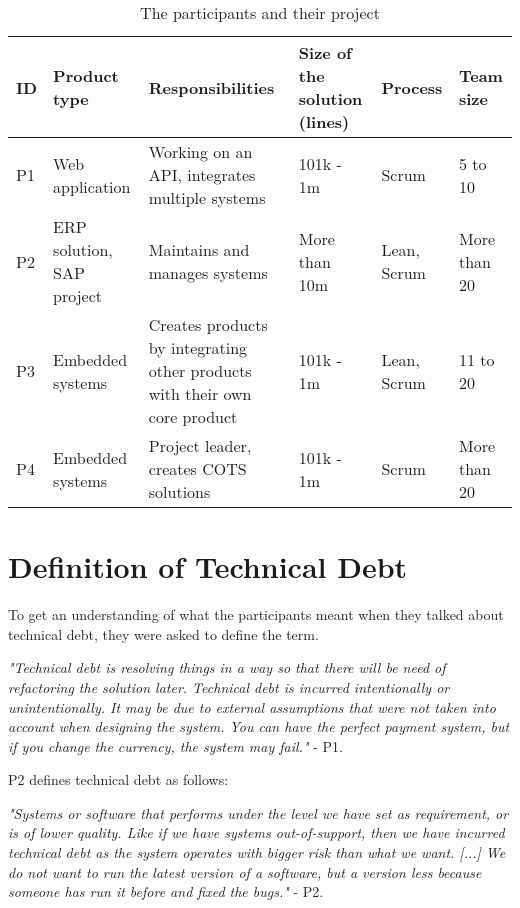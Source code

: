 \begin{table}[ht!]
	\centering
    \begin{tabular}{|p{0.5cm}|p{2.5cm}|p{3.5cm}|p{2cm}|p{2cm}|p{2cm}|}
    \hline
    \textbf{ID} & \textbf{Product type} & \textbf{Responsibilities} & \textbf{Size of the solution (lines)} & \textbf{Process} & \textbf{Team size}\\ \hline
    P1 & Web application & Working on an API, integrates multiple systems & 101k - 1m & Scrum & 5 to 10 \\ \hline
    P2 & ERP solution, SAP project & Maintains and manages systems & More than 10m & Lean, Scrum & More than 20 \\ \hline
    P3 & Embedded systems & Creates products by integrating other products with their own core product & 101k - 1m & Lean, Scrum & 11 to 20\\ \hline
    P4 & Embedded systems & Project leader, creates COTS solutions & 101k - 1m & Scrum & More than 20 \\ \hline
    \end{tabular}
    \caption{The participants and their project} \label{tab:participantsResponsbilities}
\end{table}







\section{Definition of Technical Debt}
\label{sec:techDebt}
To get an understanding of what the participants meant when they talked about technical debt, they were asked to define the term.
\begin{displayquote}
\textit{"Technical debt is resolving things in a way so that there will be need of refactoring the solution later. Technical debt is incurred intentionally or unintentionally. It may be due to external assumptions that were not taken into account when designing the system. You can have the perfect payment system, but if you change the currency, the system may fail."} - P1.  
\end{displayquote}

P2 defines technical debt as follows:
\begin{displayquote}
\textit{"Systems or software that performs under the level we have set as requirement, or is of lower quality. Like if we have systems out-of-support, then we have incurred technical debt as the system operates with bigger risk than what we want. [...] We do not want to run the latest version of a software, but a version less because someone has run it before and fixed the bugs."} - P2.
\end{displayquote}

